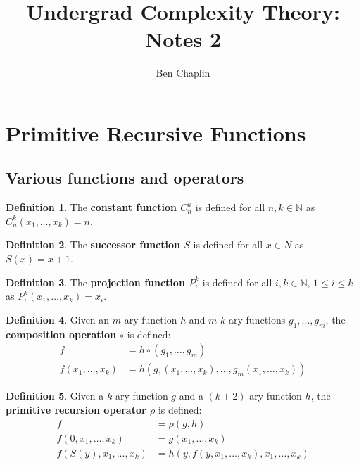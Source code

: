 \documentclass[11pt]{article}
\title{Undergrad Complexity Theory: Notes 2}
\author{Ben Chaplin}
\date{}
\theoremstyle{plain}
\theoremstyle{definition}
\newtheorem*{defn}{Definition}
\newcommand{\N}{\mathbb{N}}
\begin{document}
\maketitle
\tableofcontents

\section{Primitive Recursive Functions}
\subsection{Various functions and operators}

\begin{defn}
	The {\bf constant function $C^k_n$} is defined for all $n, k \in \N$ as $C^k_n(x_1, \ldots, x_k) = n$.
\end{defn}

\begin{defn}
	The {\bf successor function $S$} is defined for all $x \in N$ as $S(x) = x + 1$.
\end{defn}

\begin{defn}
	The {\bf projection function $P^k_i$} is defined for all $i, k \in \N$, $1 \leq i \leq k$ as
	$P^k_i(x_1, \ldots, x_k) = x_i$.
\end{defn}

\begin{defn}
	Given an $m$-ary function $h$ and $m$ $k$-ary functions $g_1, \ldots, g_m$, the {\bf composition operation $\circ$}
	is defined:
	\begin{align*}
		f                   & = h \circ (g_1, \ldots, g_m)                              \\
		f(x_1, \ldots, x_k) & = h(g_1(x_1, \ldots, x_k), \ldots, g_m(x_1, \ldots, x_k))
	\end{align*}
\end{defn}

\begin{defn}
	Given a $k$-ary function $g$ and a $(k + 2)$-ary function $h$, the {\bf primitive recursion operator $\rho$} is defined:
	\begin{align*}
		f                         & = \rho(g, h)                                     \\
		f(0, x_1, \ldots, x_k)    & = g(x_1, \ldots, x_k)                            \\
		f(S(y), x_1, \ldots, x_k) & = h(y, f(y, x_1, \ldots, x_k), x_1, \ldots, x_k)
	\end{align*}
\end{defn}
\end{document}
